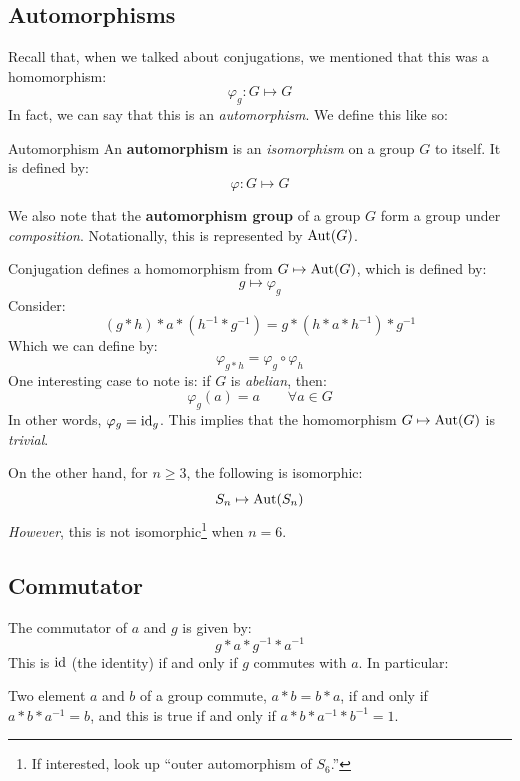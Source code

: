 \documentclass[letterpaper]{article}
\begin{document}
\subsection{Automorphisms}
Recall that, when we talked about conjugations, we mentioned that this was a homomorphism: 
\[\varphi_g: G \mapsto G\]
In fact, we can say that this is an \emph{automorphism}. We define this like so: 
\begin{definition}{Automorphism}{}
    An \textbf{automorphism} is an \emph{isomorphism} on a group $G$ to itself. It is defined by: 
    \[\varphi: G \mapsto G\]
\end{definition}
We also note that the \textbf{automorphism group} of a group $G$ form a group under \emph{composition}. Notationally, this is represented by $\operatorname{Aut}(G)$.

\bigskip 

Conjugation defines a homomorphism from $G \mapsto \operatorname{Aut}(G)$, which is defined by: 
\[g \mapsto \varphi_g\]
Consider:
\[(g * h) * a * (h^{-1} * g^{-1}) = g * (h * a * h^{-1}) * g^{-1}\]
Which we can define by: 
\[\varphi_{g * h} = \varphi_g \circ \varphi_h\]
One interesting case to note is: if $G$ is \emph{abelian}, then: 
\[\varphi_g (a) = a \qquad \forall a \in G\]
In other words, $\varphi_g = \operatorname{id}_g$. This implies that the homomorphism $G \mapsto \operatorname{Aut}(G)$ is \emph{trivial}.

\bigskip 

On the other hand, for $n \geq 3$, the following is isomorphic:  
\[S_n \mapsto \operatorname{Aut}(S_n)\]
\emph{However}, this is not isomorphic\footnote{If interested, look up ``outer automorphism of $S_6$.''} when $n = 6$. 

\subsection{Commutator}
The commutator of $a$ and $g$ is given by: 
\[g * a * g^{-1} * a^{-1}\]
This is $\operatorname{id}$ (the identity) if and only if $g$ commutes with $a$. In particular: 
\begin{lemma}{}{}
    Two element $a$ and $b$ of a group commute, $a * b = b * a$, if and only if $a * b * a^{-1} = b$, and this is true if and only if $a * b * a^{-1} * b^{-1} = 1$. 
\end{lemma}
\end{document}
